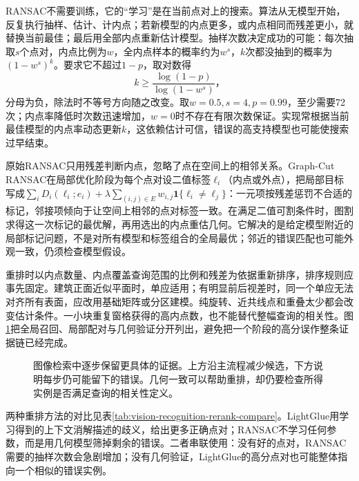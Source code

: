 RANSAC不需要训练，它的“学习”是在当前点对上的搜索。算法从无模型开始，反复执行抽样、估计、计内点；若新模型的内点更多，或内点相同而残差更小，就替换当前最佳；最后用全部内点重新估计模型。抽样次数决定成功的可能：每次抽取$s$个点对，内点比例为$w$，全内点样本的概率约为$w^s$，$k$次都没抽到的概率为$(1-w^s)^k$。要求它不超过$1-p$，取对数得
\begin{equation}
 k\geq\frac{\log(1-p)}{\log(1-w^s)}\text{，}
 \label{eq:vision-ransac-iterations}
\end{equation}
分母为负，除法时不等号方向随之改变。取$w=0.5,s=4,p=0.99$，至少需要72次；内点率降低时次数迅速增加，$w=0$时不存在有限次数保证。实现常根据当前最佳模型的内点率动态更新$k$，这依赖估计可信，错误的高支持模型也可能使搜索过早结束。

原始RANSAC只用残差判断内点，忽略了点在空间上的相邻关系。Graph-Cut RANSAC在局部优化阶段为每个点对设二值标签$\ell_i$（内点或外点），把局部目标写成$\sum_iD_i(\ell_i;e_i)+\lambda\sum_{(i,j)\in E}w_{i,j}\mathbf1\{\ell_i\ne\ell_j\}$：一元项按残差惩罚不合适的标记，邻接项倾向于让空间上相邻的点对标签一致。在满足二值可割条件时，图割求得这一次标记的最优解，再用选出的内点重估几何。它解决的是给定模型附近的局部标记问题，不是对所有模型和标签组合的全局最优；邻近的错误匹配也可能外观一致，仍须检查模型假设。

重排时以内点数量、内点覆盖查询范围的比例和残差为依据重新排序，排序规则应事先固定。建筑正面近似平面时，单应适用；有明显前后视差时，同一个单应无法对齐所有表面，应改用基础矩阵或分区建模。纯旋转、近共线点和重叠太少都会改变估计条件。一小块重复窗格获得的高内点数，也不能替代整幅查询的相关性。图\ref{fig:vision-retrieval-evidence}把全局召回、局部配对与几何验证分开列出，避免把一个阶段的高分误作整条证据链已经完成。

\begin{figure}[htbp]
 \centering
 
 \caption{图像检索中逐步保留更具体的证据。上方沿主流程减少候选，下方说明每步仍可能留下的错误。几何一致可以帮助重排，却仍要检查所得实例是否满足查询的相关性定义。}
 \label{fig:vision-retrieval-evidence}
\end{figure}

两种重排方法的对比见表\ref{tab:vision-recognition-rerank-compare}。LightGlue用学习得到的上下文消解描述的歧义，给出更多正确点对；RANSAC不学习任何参数，而是用几何模型筛掉剩余的错误。二者串联使用：没有好的点对，RANSAC需要的抽样次数会急剧增加；没有几何验证，LightGlue的高分点对也可能整体指向一个相似的错误实例。

